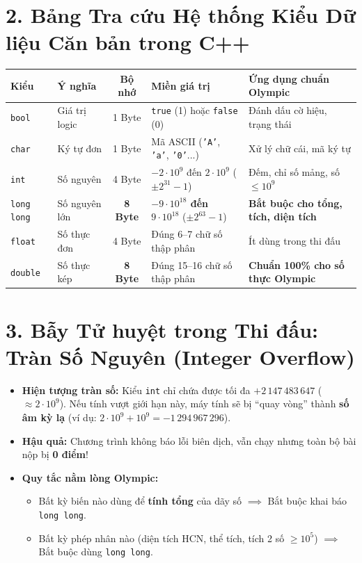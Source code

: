\documentclass[11pt,a4paper]{article}
\begin{document}
\vspace{-2mm}
\section*{\color{AsianDarkBlue}\normalsize 2. Bảng Tra cứu Hệ thống Kiểu Dữ liệu Căn bản trong C++}
\begin{center}
\footnotesize
\begin{tabular}{@{}lp{2.2cm}cp{4.6cm}p{4.5cm}@{}}
\toprule
\textbf{Kiểu} & \textbf{Ý nghĩa} & \textbf{Bộ nhớ} & \textbf{Miền giá trị} & \textbf{Ứng dụng chuẩn Olympic} \\
\midrule
\texttt{bool} & Giá trị logic & 1 Byte & \texttt{true} (1) hoặc \texttt{false} (0) & Đánh dấu cờ hiệu, trạng thái \\
\texttt{char} & Ký tự đơn & 1 Byte & Mã ASCII (\texttt{'A'}, \texttt{'a'}, \texttt{'0'}...) & Xử lý chữ cái, mã ký tự \\
\texttt{int} & Số nguyên & 4 Byte & $-2 \cdot 10^9$ đến $2 \cdot 10^9$ ($\pm 2^{31}-1$) & Đếm, chỉ số mảng, số $\le 10^9$ \\
\texttt{long long} & Số nguyên lớn & \textbf{8 Byte} & \textbf{$-9 \cdot 10^{18}$ đến $9 \cdot 10^{18}$} ($\pm 2^{63}-1$) & \textbf{Bắt buộc cho tổng, tích, diện tích} \\
\texttt{float} & Số thực đơn & 4 Byte & Đúng 6--7 chữ số thập phân & Ít dùng trong thi đấu \\
\texttt{double} & Số thực kép & \textbf{8 Byte} & Đúng 15--16 chữ số thập phân & \textbf{Chuẩn 100\% cho số thực Olympic} \\
\bottomrule
\end{tabular}
\end{center}

\vspace{-2mm}
\section*{\color{AsianDarkBlue}\normalsize 3. Bẫy Tử huyệt trong Thi đấu: Tràn Số Nguyên (Integer Overflow)}
\begin{itemize}
    \setlength{\itemsep}{0.5pt}
    \small
    \item \textbf{Hiện tượng tràn số:} Kiểu \texttt{int} chỉ chứa được tối đa $+2\,147\,483\,647$ ($\approx 2 \cdot 10^9$). Nếu tính vượt giới hạn này, máy tính sẽ bị ``quay vòng'' thành \textbf{số âm kỳ lạ} (ví dụ: $2 \cdot 10^9 + 10^9 = -1\,294\,967\,296$).
    \item \textbf{Hậu quả:} Chương trình không báo lỗi biên dịch, vẫn chạy nhưng toàn bộ bài nộp bị \textbf{0 điểm}!
    \item \textbf{Quy tắc nằm lòng Olympic:}
    \begin{itemize}
        \item Bất kỳ biến nào dùng để \textbf{tính tổng} của dãy số $\implies$ Bắt buộc khai báo \texttt{long long}.
        \item Bất kỳ phép nhân nào (diện tích HCN, thể tích, tích 2 số $\ge 10^5$) $\implies$ Bắt buộc dùng \texttt{long long}.
    \end{itemize}
\end{itemize}
\end{document}
